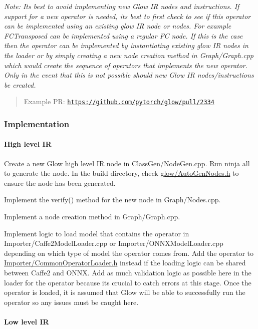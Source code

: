 {\itshape Note\+: It\textquotesingle{}s best to avoid implementing new Glow IR nodes and instructions. If support for a new operator is needed, it\textquotesingle{}s best to first check to see if this operator can be implemented using an existing glow IR node or nodes. For example F\+C\+Transposed can be implemented using a regular FC node. If this is the case then the operator can be implemented by instantiating existing glow IR nodes in the loader or by simply creating a new node creation method in {\ttfamily Graph/\+Graph.\+cpp} which would create the sequence of operators that implements the new operator. Only in the event that this is not possible should new Glow IR nodes/instructions be created.}

\begin{quote}
Example PR\+: \href{https://github.com/pytorch/glow/pull/2334}{\tt https\+://github.\+com/pytorch/glow/pull/2334} \end{quote}


\subsubsection*{Implementation}

\paragraph*{High level IR}


\begin{DoxyItemize}
\item Create a new Glow high level IR node in {\ttfamily Class\+Gen/\+Node\+Gen.\+cpp}. Run {\ttfamily ninja all} to generate the node. In the build directory, check {\ttfamily \hyperlink{_auto_gen_nodes_8h_source}{glow/\+Auto\+Gen\+Nodes.\+h}} to ensure the node has been generated.
\item Implement the {\ttfamily verify()} method for the new node in {\ttfamily Graph/\+Nodes.\+cpp}.
\item Implement a node creation method in {\ttfamily Graph/\+Graph.\+cpp}.
\item Implement logic to load model that contains the operator in {\ttfamily Importer/\+Caffe2\+Model\+Loader.\+cpp} or {\ttfamily Importer/\+O\+N\+N\+X\+Model\+Loader.\+cpp} depending on which type of model the operator comes from. Add the operator to {\ttfamily \hyperlink{_common_operator_loader_8h_source}{Importer/\+Common\+Operator\+Loader.\+h}} instead if the loading logic can be shared between Caffe2 and O\+N\+NX. Add as much validation logic as possible here in the loader for the operator because it\textquotesingle{}s crucial to catch errors at this stage. Once the operator is loaded, it is assumed that Glow will be able to successfully run the operator so any issues must be caught here. \paragraph*{Low level IR}
\end{DoxyItemize}


